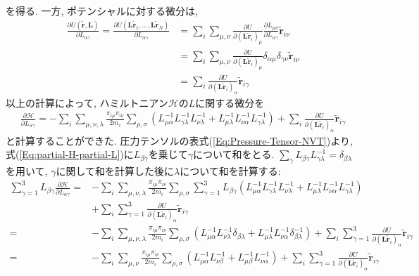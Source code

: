 を得る. 一方, ポテンシャルに対する微分は, 
\begin{align}
  \frac{\partial U(\tilde{\bm{r}}, \bm{L})}{\partial L_{\alpha\gamma}} =
  \frac{\partial U(\bm{L}\tilde{\bm{r}}_{1},\ldots,\bm{L}\tilde{\bm{r}}_{N})}{\partial L_{\alpha\gamma}} &=
  \sum_{i}\sum_{\mu,\nu}
  \frac{\partial U}{\partial (\bm{L}\tilde{\bm{r}}_{i})_{\mu}}
  \frac{\partial L_{\mu\nu}}{\partial L_{\alpha\gamma}}\tilde{\bm{r}}_{i\nu} \\ &=
  \sum_{i}\sum_{\mu,\nu}
  \frac{\partial U}{\partial (\bm{L}\tilde{\bm{r}}_{i})_{\mu}}
  \delta_{\alpha\mu}\delta_{\gamma\nu}\tilde{\bm{r}}_{i\nu} \\ &=
  \sum_{i} \frac{\partial U}{\partial (\bm{L}\tilde{\bm{r}}_{i})_{\alpha}} \tilde{\bm{r}}_{i\gamma}
\end{align}
以上の計算によって, ハミルトニアン$\mathcal{H}$の$L$に関する微分を
\begin{align}
  \frac{\partial \mathcal{H}}{\partial L_{\alpha\gamma}} =
  -\sum_{i} \sum_{\mu,\nu,\lambda} \frac{\pi_{i\mu}\pi_{i\nu}}{2m_{i}}
  \sum_{\rho,\sigma}
  \left(
    L_{\mu\alpha}^{-1} L_{\gamma\lambda}^{-1} L_{\nu\lambda}^{-1} +
    L_{\mu\lambda}^{-1} L_{\nu\alpha}^{-1} L_{\gamma\lambda}^{-1}
  \right) +
  \sum_{i} \frac{\partial U}{\partial (\bm{L}\tilde{\bm{r}}_{i})_{\alpha}} \tilde{\bm{r}}_{i\gamma}
  \label{Eq:partial-H-partial-L}
\end{align}
と計算することができた. 圧力テンソルの表式(\ref{Eq:Pressure-Tensor-NVT})より, 式(\ref{Eq:partial-H-partial-L})に$L_{\beta\gamma}$を乗じて$\gamma$について和をとる. 
$\sum_{\gamma} L_{\beta\gamma}L_{\gamma\lambda}^{-1} = \delta_{\beta\lambda}$を用いて, $\gamma$に関して和を計算した後に$\lambda$について和を計算する:
\begin{align}
  \sum_{\gamma=1}^{3} L_{\beta\gamma} \frac{\partial \mathcal{H}}{\partial L_{\alpha\gamma}} =&
  -\sum_{i} \sum_{\mu,\nu,\lambda} \frac{\pi_{i\mu}\pi_{i\nu}}{2m_{i}}
  \sum_{\rho,\sigma} \sum_{\gamma=1}^{3} L_{\beta\gamma}
  \left(
    L_{\mu\alpha}^{-1} L_{\gamma\lambda}^{-1} L_{\nu\lambda}^{-1} +
    L_{\mu\lambda}^{-1} L_{\nu\alpha}^{-1} L_{\gamma\lambda}^{-1}
  \right) \\ &+
  \sum_{i} \sum_{\gamma=1}^{3} \frac{\partial U}{\partial (\bm{L}\tilde{\bm{r}}_{i})_{\alpha}} \tilde{\bm{r}}_{i\gamma}
  \\
  =&
  -\sum_{i} \sum_{\mu,\nu,\lambda} \frac{\pi_{i\mu}\pi_{i\nu}}{2m_{i}}
  \sum_{\rho,\sigma}
  \left(
    L_{\mu\alpha}^{-1} L_{\nu\lambda}^{-1} \delta_{\beta\lambda} +
    L_{\mu\lambda}^{-1} L_{\nu\alpha}^{-1} \delta_{\beta\lambda}^{-1}
  \right) +
  \sum_{i} \sum_{\gamma=1}^{3} \frac{\partial U}{\partial (\bm{L}\tilde{\bm{r}}_{i})_{\alpha}} \tilde{\bm{r}}_{i\gamma}
  \\
  =&
  -\sum_{i} \sum_{\mu,\nu} \frac{\pi_{i\mu}\pi_{i\nu}}{2m_{i}}
  \sum_{\rho,\sigma}
  \left(
    L_{\mu\alpha}^{-1} L_{\nu\beta}^{-1} +
    L_{\mu\beta}^{-1} L_{\nu\alpha}^{-1}
  \right) +
  \sum_{i} \sum_{\gamma=1}^{3} \frac{\partial U}{\partial (\bm{L}\tilde{\bm{r}}_{i})_{\alpha}} \tilde{\bm{r}}_{i\gamma}
\end{align}
